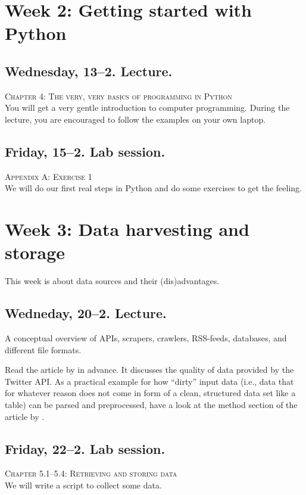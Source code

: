 \section*{Week 2: Getting started with Python}

\subsection*{Wednesday, 13--2. Lecture.}
\textsc{ Chapter 4: The very, very basics of programming in Python}\\
You will get a very gentle introduction to computer programming. During the lecture, you are encouraged to follow the examples on your own laptop.


\subsection*{Friday, 15--2. Lab session.}
\textsc{ Appendix A: Exercise 1}\\
We will do our first real steps in Python and do some exercises to get the feeling. 


\section*{Week 3: Data harvesting and storage}
This week is about data sources and their (dis)advantages. 

\subsection*{Wedneday, 20--2. Lecture.}
A conceptual overview of APIs, scrapers, crawlers, RSS-feeds, databases, and different file formats.

Read the article by \cite{Morstatter2013} in advance. It discusses the quality of data provided by the Twitter API. As a practical example for how ``dirty'' input data (i.e., data that for whatever reason does not come in form of a clean, structured data set like a table) can be parsed and preprocessed, have a look at the method section of the article by \cite{Lewis2013}. 


\subsection*{Friday, 22--2. Lab session.}
\textsc{ Chapter 5.1--5.4: Retrieving and storing data}\\
We will write a script to collect some data. 




